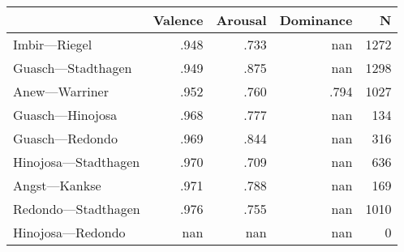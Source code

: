 \begin{tabular}{lrrrr}
\toprule
{} &  Valence &  Arousal &  Dominance &     N \\
\midrule
Imbir---Riegel        &     .948 &     .733 &        nan &  1272 \\
Guasch---Stadthagen   &     .949 &     .875 &        nan &  1298 \\
Anew---Warriner       &     .952 &     .760 &       .794 &  1027 \\
Guasch---Hinojosa     &     .968 &     .777 &        nan &   134 \\
Guasch---Redondo      &     .969 &     .844 &        nan &   316 \\
Hinojosa---Stadthagen &     .970 &     .709 &        nan &   636 \\
Angst---Kankse        &     .971 &     .788 &        nan &   169 \\
Redondo---Stadthagen  &     .976 &     .755 &        nan &  1010 \\
Hinojosa---Redondo    &      nan &      nan &        nan &     0 \\
\bottomrule
\end{tabular}

